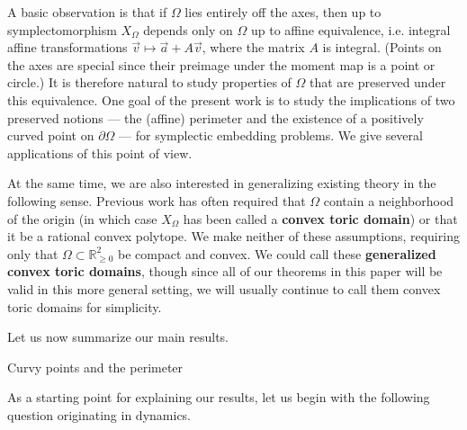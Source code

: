 \documentclass[11pt, reqno]{amsart}
\makeatletter
\def\subsection{\@startsection{subsection}{2}%
  \z@{.75\linespacing\@plus.7\linespacing}{-.5em}%
  {\normalfont\large\bfseries}}
\theoremstyle{remark}
\numberwithin{equation}{subsection}
\numberwithin{figure}{section}
\theoremstyle{customremark}
\newcommand{\Om}{{\Omega}}
\newcommand{\R}{\mathbb{R}}
\makeatother
\begin{document}
  

A basic observation is that if $\Om$ lies entirely off the axes, then up to symplectomorphism $X_\Om$ depends only on  $\Om$ up to affine equivalence, i.e. integral affine transformations $\vec{v} \mapsto\vec a + A \vec{v}$, where the matrix $A$ is integral.  (Points on the axes are special  since their preimage under the moment map is a point or circle.)  It is therefore natural to study properties of $\Om$ that are preserved under this equivalence.  One goal of the present work is to study the implications of two preserved notions --- the (affine) perimeter and the existence of a positively curved point on $\partial \Om$  ---  for symplectic embedding problems.  
We give several applications of this point of view.   



At the same time, we are also interested in generalizing existing theory in the following sense. 
 Previous work has often required that $\Om$ contain a neighborhood of the origin (in which case $X_\Om$ has been called a {\bf convex toric domain}) or that it be a rational convex polytope.  We make neither of these assumptions, requiring only that $\Om\subset \R^2_{\ge 0}$ be compact and convex.  We could call these {\bf generalized convex toric domains}, though since all of our theorems in this paper will be valid in this more general setting, we will usually continue to call them convex toric domains for simplicity.
 

 

Let us now summarize our main results.  



\subsection{Curvy points and the perimeter}

As a starting point for explaining our results,  
let us begin with the following question originating in dynamics.  
\end{document}

